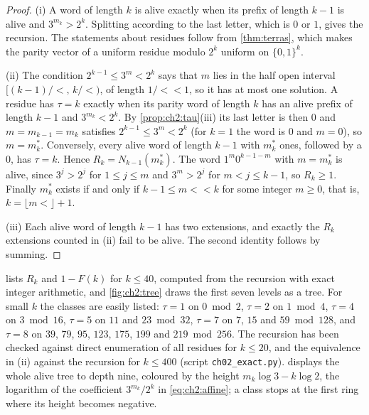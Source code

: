 \begin{proof}
(i) A word of length $k$ is alive exactly when its prefix of length $k-1$ is
alive and $3^{m_k}>2^k$. Splitting according to the last letter, which is $0$
or $1$, gives the recursion. The statements about residues follow from
\cref{thm:terras}, which makes the parity vector of a uniform residue modulo
$2^k$ uniform on $\{0,1\}^k$.

(ii) The condition $2^{k-1}\leq3^m<2^k$ says that $m$ lies in the half open
interval $\bigl[(k-1)/\lt,\,k/\lt\bigr)$, of length $1/\lt<1$, so it has at
most one solution. A residue has $\tau=k$ exactly when its parity word of
length $k$ has an alive prefix of length $k-1$ and $3^{m_k}<2^k$. By
\cref{prop:ch2:tau}(iii) its last letter is then $0$ and $m=m_{k-1}=m_k$
satisfies $2^{k-1}\leq3^m<2^k$ (for $k=1$ the word is $0$ and $m=0$), so $m=m^\ast_k$. Conversely, every alive word of
length $k-1$ with $m^\ast_k$ ones, followed by a $0$, has $\tau=k$. Hence
$R_k=N_{k-1}(m^\ast_k)$. The word $1^{m}0^{k-1-m}$ with $m=m^\ast_k$ is alive,
since $3^{j}>2^{j}$ for $1\leq j\leq m$ and $3^m>2^{j}$ for $m<j\leq k-1$, so $R_k\geq1$. Finally
$m^\ast_k$ exists if and only if $k-1\leq m\lt<k$ for some integer $m\geq0$, that is,
$k=\lfloor m\lt\rfloor+1$.

(iii) Each alive word of length $k-1$ has two extensions, and exactly the
$R_k$ extensions counted in (ii) fail to be alive. The second identity
follows by summing.
\end{proof}

 lists $R_k$ and $1-F(k)$ for $k\leq40$, computed
from the recursion with exact integer arithmetic, and \cref{fig:ch2:tree}
draws the first seven levels as a tree. For small $k$ the classes are easily
listed: $\tau=1$ on $0\bmod2$, $\tau=2$ on $1\bmod4$, $\tau=4$ on $3\bmod16$,
$\tau=5$ on $11$ and $23\bmod32$, $\tau=7$ on $7$, $15$ and $59\bmod128$, and
$\tau=8$ on $39$, $79$, $95$, $123$, $175$, $199$ and $219\bmod256$. The
recursion has been checked against direct enumeration of all residues for
$k\leq20$, and the equivalence in (ii) against the recursion for $k\leq400$
(script \texttt{ch02\_exact.py}).  displays the whole
alive tree to depth nine, coloured by the height $m_k\log3-k\log2$, the
logarithm of the coefficient $3^{m_k}/2^k$ in \eqref{eq:ch2:affine}; a class
stops at the first ring where its height becomes negative.

